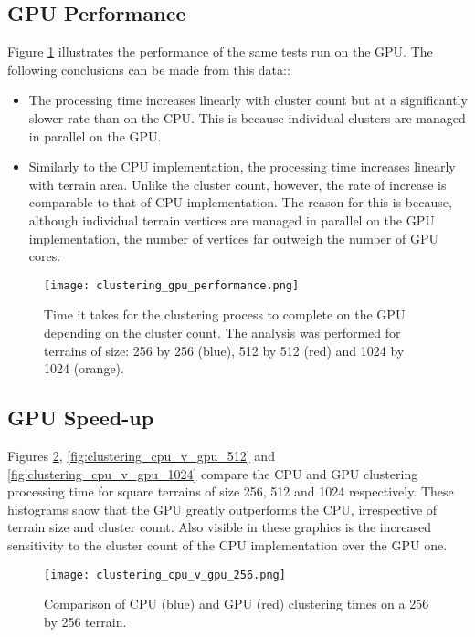 \subsection{GPU Performance}

Figure \ref{fig:gpu_clustering_performance} illustrates the performance of the same tests run on the GPU. The following conclusions can be made from this data::
\begin{itemize}
\item The processing time increases linearly with cluster count but at a significantly slower rate than on the CPU. This is because individual clusters are managed in parallel on the GPU.
\item Similarly to the CPU implementation, the processing time increases linearly with terrain area. Unlike the cluster count, however, the rate of increase is comparable to that of CPU implementation. The reason for this is because, although individual terrain vertices are managed in parallel on the GPU implementation, the number of vertices far outweigh the number of GPU cores. 
\end{itemize}

\begin{figure}
\center
	\texttt{[image: clustering\_gpu\_performance.png]}
	\caption{ Time it takes for the clustering process to complete on the GPU depending on the cluster count. The analysis was performed for terrains of size: 256 by 256 (blue), 512 by 512 (red) and 1024 by 1024 (orange).}	
	\label{fig:gpu_clustering_performance}
\end{figure}

\subsection{GPU Speed-up}

Figures \ref{fig:clustering_cpu_v_gpu_256}, \ref{fig:clustering_cpu_v_gpu_512} and \ref{fig:clustering_cpu_v_gpu_1024} compare the CPU and GPU clustering processing time for square terrains of size 256, 512 and 1024 respectively. These histograms show that the GPU greatly outperforms the CPU, irrespective of terrain size and cluster count. Also visible in these graphics is the increased sensitivity to the cluster count of the CPU implementation over the GPU one. \\

\begin{figure}
\center
	\texttt{[image: clustering\_cpu\_v\_gpu\_256.png]}
	\caption{ Comparison of CPU (blue) and GPU (red) clustering times on a 256 by 256 terrain.}	
	\label{fig:clustering_cpu_v_gpu_256}
\end{figure}

